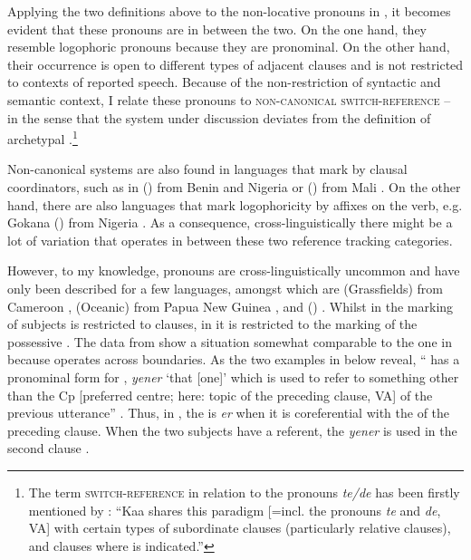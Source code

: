 \documentclass[output=paper,newtxmath,modfonts,nonflat,hidelinks]{langsci/langscibook}
\begin{document}
Applying the two definitions above to the non-locative   pronouns in , it becomes evident that these pronouns are in between the two. On the one hand, they resemble logophoric pronouns because they are pronominal. On the other hand, their occurrence is open to different types of adjacent clauses and is not restricted to contexts of reported speech. Because of the non-restriction of syntactic and semantic context, I relate these pronouns to \textsc{non-canonical switch-reference} -- in the sense that the system under discussion deviates from the definition of archetypal .\footnote{The term \textsc{switch-reference} in relation to the pronouns \textit{te/de} has been firstly mentioned by \citet{Neely2013}: “Kaa shares this paradigm [=incl. the  pronouns \textit{te} and \textit{de}, VA] with certain types of subordinate clauses (particularly relative clauses), and clauses where  is indicated.”} 

Non-canonical systems are also found in languages that mark  by clausal coordinators, such as in  () from Benin and Nigeria \citep[113f]{LefebvreBrousseau02} or  () from Mali \citep[602ff]{Carlson1994}. On the other hand, there are also languages that mark logophoricity by affixes on the verb, e.g. Gokana () from Nigeria \citep{HymanComrie81}. As a consequence, cross-linguistically there might be a lot of variation that operates in between these two reference tracking categories.

However, to my knowledge,  pronouns are cross-linguistically uncommon and have only been described for a few languages, amongst which are  (Grassfields) from Cameroon \citep[53]{Wiesemann82},  (Oceanic) from Papua New Guinea \citep[391]{Crowleyetal11}, and  () \citep[311]{Prince2006}. Whilst in  the  marking of subjects is restricted to  clauses, in  it is restricted to the marking of the possessive . The data from  show a situation somewhat comparable to the one in  because  operates across  boundaries. As the two examples in  below reveal, “ has a pronominal form for , \textit{yener} ‘that [one]’ which is used to refer to something other than the Cp [preferred centre; here: topic of the preceding clause, VA] of the previous utterance” \citep[311]{Prince2006}. Thus, in , the  is \textit{er} when it is coreferential with the  of the preceding clause. When the two subjects have a  referent, the  \textit{yener} is used in the second clause .
\end{document}
